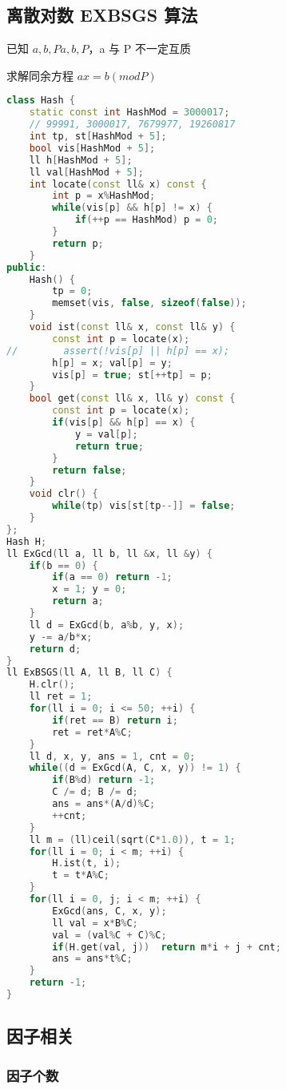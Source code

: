 \subsection{离散对数 EXBSGS 算法}

已知 $a, b, Pa, b, P$，a 与 P 不一定互质

求解同余方程 $ax = b (mod P)$

\begin{lstlisting}[language=C++]
class Hash {
    static const int HashMod = 3000017;
    // 99991, 3000017, 7679977, 19260817
    int tp, st[HashMod + 5];
    bool vis[HashMod + 5];
    ll h[HashMod + 5];
    ll val[HashMod + 5];
    int locate(const ll& x) const {
        int p = x%HashMod;
        while(vis[p] && h[p] != x) {
            if(++p == HashMod) p = 0;
        }
        return p;
    }
public:
    Hash() {
        tp = 0;
        memset(vis, false, sizeof(false));
    }
    void ist(const ll& x, const ll& y) {
        const int p = locate(x);
//        assert(!vis[p] || h[p] == x);
        h[p] = x; val[p] = y;
        vis[p] = true; st[++tp] = p;
    }
    bool get(const ll& x, ll& y) const {
        const int p = locate(x);
        if(vis[p] && h[p] == x) {
            y = val[p];
            return true;
        }
        return false;
    }
    void clr() {
        while(tp) vis[st[tp--]] = false;
    }
};
Hash H;
ll ExGcd(ll a, ll b, ll &x, ll &y) {
    if(b == 0) {
        if(a == 0) return -1;
        x = 1; y = 0;
        return a;
    }
    ll d = ExGcd(b, a%b, y, x);
    y -= a/b*x;
    return d;
}
ll ExBSGS(ll A, ll B, ll C) {
    H.clr();
    ll ret = 1;
    for(ll i = 0; i <= 50; ++i) {
        if(ret == B) return i;
        ret = ret*A%C;
    }
    ll d, x, y, ans = 1, cnt = 0;
    while((d = ExGcd(A, C, x, y)) != 1) {
        if(B%d) return -1;
        C /= d; B /= d;
        ans = ans*(A/d)%C;
        ++cnt;
    }
    ll m = (ll)ceil(sqrt(C*1.0)), t = 1;
    for(ll i = 0; i < m; ++i) {
        H.ist(t, i);
        t = t*A%C;
    }
    for(ll i = 0, j; i < m; ++i) {
        ExGcd(ans, C, x, y);
        ll val = x*B%C;
        val = (val%C + C)%C;
        if(H.get(val, j))  return m*i + j + cnt;
        ans = ans*t%C;
    }
    return -1;
}
\end{lstlisting}

\subsection{因子相关}

\subsubsection{因子个数}

